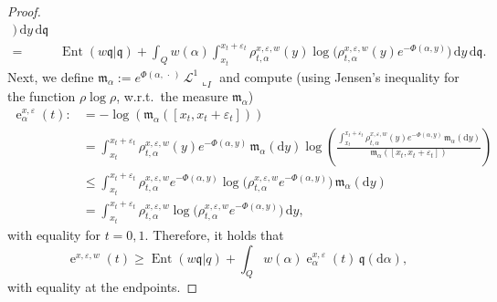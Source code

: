 \documentclass[10pt,a4paper]{amsart}
\DeclareMathOperator{\Ent}{Ent}
\DeclareMathOperator{\ee}{e}
\let\epsilon\varepsilon
\let\varepsilon\temp
\newcommand{\de}{{\mathrm{d}}}
\newcommand{\dotargument}{\,\cdot\,}
\newcommand{\mm}{\mathfrak m}
\newcommand{\q}{\mathfrak{q}}
\renewcommand{\L}{\mathcal{L}}
\begin{document}
\begin{proof}
\begin{align*}
        \big)
        \,
        \de y
        \,
        \de\q
    \\
    =&
      \Ent(w\q|\q)
      +
        \int_Q
         w(\alpha)
        \int_{x_t}^{x_t+\epsilon_t}
         \rho^{x,\epsilon,w}_{t,\alpha}(y)
    \log
    \big(
        \rho^{x,\epsilon,w}_{t,\alpha}(y)
        e^{-\Phi(\alpha,y)}
        \big)
        \,
        \de y
        \,
        \de\q
       .
  \end{align*}
  Next, we define
  $\mm_\alpha:=e^{\Phi(\alpha,\dotargument)}\,\L^1\llcorner_{I}$ and
  compute (using Jensen's inequality for the function $\rho\log\rho$,
  w.r.t.\ the measure $\mm_\alpha$)
  \begin{align*}
    \ee_\alpha^{x,\epsilon}(t)
    :&=
      -
      \log(
      \mm_\alpha([x_t,x_t+\epsilon_t])
      )
      \iffalse
      =
      \log\left(
      \frac{1}{
      \mm_\alpha([x_t,x_t+\epsilon_t])
      }
      \right)
      =
      \log
      \left(
      \frac{
      \int_{x_t}^{x_t+\epsilon_t}
      \rho^{x,\epsilon,w}_{t,\alpha}(y)
      e^{-\Phi(\alpha,y)}
      \,
      \mm_\alpha(\de y)
      }{\mm_\alpha([x_t,x_t+\epsilon_t])}
      \right)
      \fi
    \\
    &
      =
      \int_{x_t}^{x_t+\epsilon_t}
      \rho^{x,\epsilon,w}_{t,\alpha}(y)
      e^{-\Phi(\alpha,y)}
      \,
      \mm_\alpha(\de y)
      \log
      \left(
      \frac{
      \int_{x_t}^{x_t+\epsilon_t}
      \rho^{x,\epsilon,w}_{t,\alpha}(y)
      e^{-\Phi(\alpha,y)}
      \,
      \mm_\alpha(\de y)
      }{\mm_\alpha([x_t,x_t+\epsilon_t])}
      \right)
          \\
    &
\leq
      \int_{x_t}^{x_t+\epsilon_t}
      \rho^{x,\epsilon,w}_{t,\alpha}
      e^{-\Phi(\alpha,y)}
      \log
      \big(
      \rho^{x,\epsilon,w}_{t,\alpha}
      e^{-\Phi(\alpha,y)}
      \big)
      \,
      \mm_\alpha(\de y)
    \\
    &
      =
      \int_{x_t}^{x_t+\epsilon_t}
      \rho^{x,\epsilon,w}_{t,\alpha}
      \log
      \big(
      \rho^{x,\epsilon,w}_{t,\alpha}
      e^{-\Phi(\alpha,y)}
      \big)
      \,
      \de y
    ,
  \end{align*}
  with equality for $t=0,1$.
%
  Therefore, it holds that
  \begin{equation}
    \ee^{x,\epsilon,w}(t)
    \geq
    \Ent(w\q|q)
    +
    \int_Q
    w(\alpha)
    \ee_\alpha^{x,\epsilon}
    (t)
    \,
    \q(\de\alpha)
    ,
  \end{equation}
  with equality at the endpoints.

\end{proof}
\end{document}
